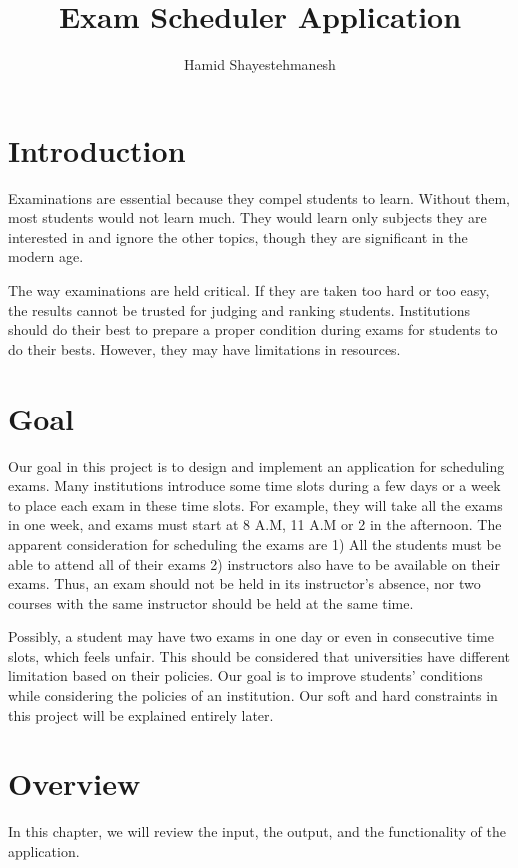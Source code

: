 \documentclass{report}
\begin{document}
\author{Hamid Shayestehmanesh}
\title{Exam Scheduler Application}
\maketitle
\tableofcontents
\newpage
\chapter{Introduction}
Examinations are essential because they compel students to learn. Without them, most students would not learn much. They would learn only subjects they are interested in and ignore the other topics, though they are significant in the modern age. 
\par
The way examinations are held critical. If they are taken too hard or too easy, the results cannot be trusted for judging and ranking students. Institutions should do their best to prepare a proper condition during exams for students to do their bests. However, they may have limitations in resources.
\chapter{Goal}
Our goal in this project is to design and implement an application for scheduling exams. Many institutions introduce some time slots during a few days or a week to place each exam in these time slots. For example,  they will take all the exams in one week, and exams must start at 8 A.M, 11 A.M or 2 in the afternoon. The apparent consideration for scheduling the exams are 1) All the students must be able to attend all of their exams 2) instructors also have to be available on their exams. Thus, an exam should not be held in its instructor's absence, nor two courses with the same instructor should be held at the same time. 


Possibly, a student may have two exams in one day or even in consecutive time slots, which feels unfair. This should be considered that universities have different limitation based on their policies. Our goal is to improve students' conditions while considering the policies of an institution. Our soft and hard constraints in this project will be explained entirely later.

\chapter{Overview}
In this chapter, we will review the input, the output, and the functionality of the application.
\end{document}
